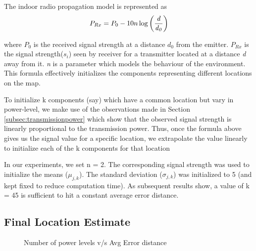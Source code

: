 \documentclass{Localization-PaperWriteupDraft}
\begin{document}
The indoor radio propagation model is represented as
\begin{align}
P_{Rx} = P_{0} - 10n\log\left(\frac {\it d} {\it d_{0}}\right) 
\end{align}

\noindent
where $P_{0}$ is the received signal strength at a distance $d_{0}$ from the
emitter. $P_{Rx}$ is the signal strength($s_{i}$) seen by receiver for a
transmitter located at a distance {\it d} away from it. {\it n} is a
parameter which models the behaviour of the environment. This formula
effectively initializes the components representing different locations
on the map.

To initialize k components (say) which have a common location but vary in
power-level, we make use of the observations made in Section
\ref{subsec:transmissionpower} which show that the observed signal strength is linearly proportional to the transmission power. 
Thus, once the formula above gives us the signal value for
a specific location, we extrapolate the value linearly to initialize
each of the k components for that location 

In our experiments, we set n = 2. The corresponding signal strength was
used to initialize the means ($\mu_{j, k}$). The standard deviation
($\sigma_{j, k}$) was initialized to
5 (and kept fixed to reduce computation time). As subsequent results
show, a value of k = 45 is sufficient to hit a constant average error
distance.

\subsection{Final Location Estimate}
\label{subsec:finallocationestimate}

\begin{figure}
	\centering
		 \quad \quad
	\caption{Number of power levels v/s Avg Error distance}
	\label{fig:powerlevelsvserrordistance}
\end{figure}
\end{document}
